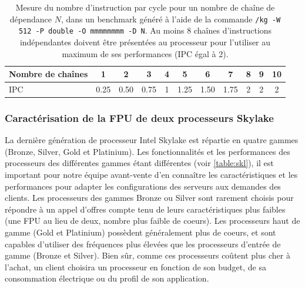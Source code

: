     \begin{table}[h!]
    \centering
    \normalsize
    \begin{tabular}{|l|c|c|c|c|c|c|c|c|c|c|}
    \hline
    Nombre de chaînes & 1 & 2 & 3 & 4 & 5 & 6 & 7 & 8 & 9 & 10 \\ \hline
    IPC & 0.25 & 0.50 & 0.75 & 1 & 1.25 & 1.50 & 1.75 & 2 & 2 & 2 \\ \hline
    \end{tabular}%
    \caption{Mesure du nombre d'instruction par cycle pour un nombre de chaîne de dépendance $N$, dans un benchmark généré à l'aide de la commande \texttt{/kg -W 512 -P double -O mmmmmmmm -D N}. Au moins 8 chaînes d'instructions indépendantes doivent être présentées au processeur pour l'utiliser au maximum de ses performances (IPC égal à 2).}
    \label{tab_kg_depth}
    \end{table}





    \subsubsection{Caractérisation de la FPU de deux processeurs Skylake}

        La dernière génération de processeur Intel Skylake est répartie en quatre gammes (Bronze, Silver, Gold et Platinium). Les fonctionnalités et les performances des processeurs des différentes gammes étant différentes (voir \autoref{table:skl}), il est important pour notre équipe avant-vente d'en connaître les caractéristiques et les performances pour adapter les configurations des serveurs aux demandes des clients. Les processeurs des gammes Bronze ou Silver sont rarement choisis pour répondre à un appel d'offres compte tenu de leurs caractéristiques plus faibles (une FPU au lieu de deux, nombre plus faible de coeurs). Les processeurs haut de gamme (Gold et Platinium) possèdent généralement plus de coeurs, et sont capables d'utiliser des fréquences plus élevées que les processeurs d'entrée de gamme (Bronze et Silver). Bien sûr, comme ces processeurs coûtent plus cher à l'achat, un client choisira un processeur en fonction de son budget, de sa consommation électrique ou du profil de son application.
        
